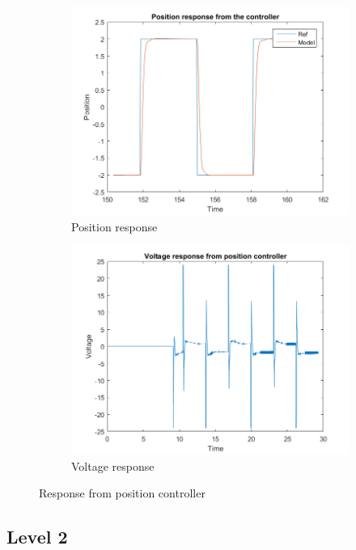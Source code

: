 \documentclass[12pt,a4paper]{article}
\begin{document}
\begin{figure}[H]
  \centering
  \begin{subfigure}[b]{0.45\linewidth}
    \includegraphics[width=\linewidth]{PosCont.png}
    \caption{Position response}
    \label{fig:pos_cont:a}
  \end{subfigure}
  \begin{subfigure}[b]{0.45\linewidth}
    \includegraphics[width=\linewidth]{PosCont_V.png}
    \caption{Voltage response}
    \label{fig:pos_cont:b}
  \end{subfigure}
  \caption{Response from position controller}
  \label{fig:pos_cont}
\end{figure}

  \subsection*{Level 2}
\end{document}

